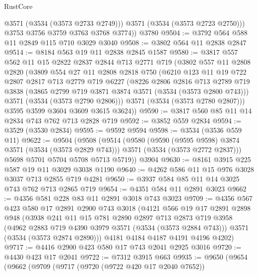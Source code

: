 \begin{lexlean}{RustCore}
\begin{coremodule}
            @3571
            (@3534 (@3573 @2733 @2749)))
          @3571
          (@3534 (@3573 @2723 @2750)))
        @3753
        @3756
        @3759
        @3763
        @3768
        @3774))
    @3780
@9504 := @3792 @564 @588 @11 @2849 @115 @710 @3029 @3040
@9508 := @3802 @564 @11 @2838 @2847
@9514 := @8184 @563 @19 @11 @2838 @2845 @1587
@9580 := @3817
    @557
    @562
    @11
    @15
    @2822
    @2837
    @2844
    @713
    @2771
    @719
    (@3802
      @557
      @11
      @2808
      @2820
      (@3809
        @554
        @27
        @11
        @2808
        @2818
        @750
        (@6210
          @123
          @11
          @19
          @722
          @2807
          @2817
          @713
          @2779
          @719
          @6227
          (@8226
            @2806
            @2816
            @713
            @2789
            @719
            @3838
            (@3865 @2799 @719 @3871 @3874 @3571 (@3534 (@3573 @2800 @743)))
            @3571
            (@3534 (@3573 @2790 @2806)))
          @3571
          (@3534 (@3573 @2780 @2807)))
        @3595
        @3599
        @3604
        @3609
        @3615
        @3624))
@9590 := @3817 @560 @85 @11 @14 @2834 @743 @762 @713 @2828 @719
@9592 := @3852 @559 @2834
@9594 := @3529 (@3530 @2834)
@9595 := @9592 @9594
@9598 := @3534 (@3536 @559 @11)
@9622 := @9504
    (@9508
      (@9514
        (@9580
          (@9590 (@9595 @9598) @3874 @3571 (@3534 (@3573 @2829 @743)))
          @3571
          (@3534 (@3573 @2772 @2837)))
        @5698
        @5701
        @5704
        @5708
        @5713
        @5719))
    @3904
@9630 := @8161 @3915 @225 @587 @19 @11 @3029 @3038 @1190
@9640 := @4262 @586 @11 @15 @976 @3028 @3037 @713 @2855 @719 @4281
@9650 := @3937 @584 @85 @11 @14 @3025 @743 @762 @713 @2865 @719
@9654 := @4351 @584 @11 @2891 @3023
@9662 := @4356 @581 @228 @83 @11 @2891 @3018 @743 @3023
@9709 := @4356
    @567
    @423
    @580
    @17
    @2891
    @2900
    @743
    @3018
    (@4121
      @566
      @19
      @17
      @2891
      @2898
      @948
      (@3938
        @241
        @11
        @15
        @781
        @2890
        @2897
        @713
        @2873
        @719
        @3958
        (@4962 @2883 @719 @4390 @3979 @3571 (@3534 (@3573 @2884 @743)))
        @3571
        (@3534 (@3573 @2874 @2890)))
      @4181
      @4184
      @4187
      @4191
      @4196
      @4202)
@9717 := @4416 @2900 @423 @580 @17 @743 @2041 @2925 @3016
@9720 := @4430 @423 @17 @2041
@9722 := @7312 @3915 @663
@9935 := @9650
    (@9654
      (@9662
        (@9709
          (@9717
            (@9720 (@9722 @420 @17 @2040 @7652))

\end{coremodule}
\end{lexlean}
